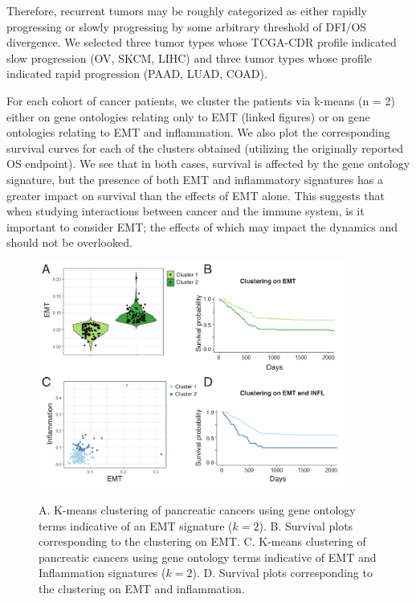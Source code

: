 \documentclass[11pt]{article}
\begin{document}
Therefore, recurrent tumors may be roughly categorized as either rapidly progressing or slowly progressing by some arbitrary threshold of DFI/OS divergence.
We selected three tumor types whose TCGA-CDR profile indicated slow progression (OV, SKCM, LIHC) and three tumor types whose profile indicated rapid progression (PAAD, LUAD, COAD).
\par
For each cohort of cancer patients, we cluster the patients via k-means (n = 2) either on gene ontologies relating only to EMT (linked figures) or on gene ontologies relating to EMT and inflammation.  We also plot the corresponding survival curves for each of the clusters obtained (utilizing the originally reported OS endpoint). We see that in both cases, survival is affected by the gene ontology signature, but the presence of both EMT and inflammatory signatures has a greater impact on survival than the effects of EMT alone. This suggests that when studying interactions between cancer and the immune system, is it important to consider EMT; the effects of which may impact the dynamics and should not be overlooked. 

\par












\begin{figure}
\center
{\includegraphics[width=0.9\textwidth]{FigTCGA.pdf}}
\caption{A. K-means clustering of pancreatic cancers using gene ontology terms indicative of an EMT signature ($k=2$). B. Survival plots corresponding to the clustering on EMT. C. K-means clustering of pancreatic cancers using gene ontology terms indicative of EMT and Inflammation signatures ($k=2$). D. Survival plots corresponding to the clustering on EMT and inflammation.}
\label{fig:tcga}
\end{figure}
\end{document}
